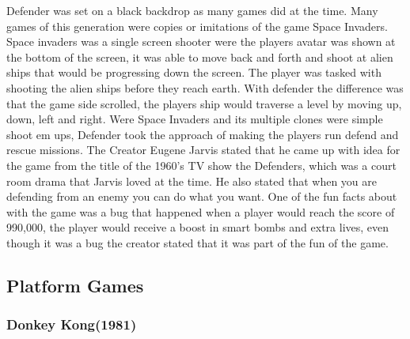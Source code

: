 \documentclass{article}
\begin{document}
Defender was set on a black backdrop as many games did at the time. Many games of this generation were copies or imitations of the game Space Invaders. Space invaders was a single screen shooter were the players avatar was shown at the bottom of the screen, it was able to move back and forth and shoot at alien ships that would be progressing down the screen. The player was tasked with shooting the alien ships before they reach earth. With defender the difference was that the game side scrolled, the players ship would traverse a level by moving up, down, left and right. Were Space Invaders and its multiple clones were simple shoot em ups, Defender took the approach of making the players run defend and rescue missions. The Creator Eugene Jarvis stated that he came up with idea for the game from the title of the 1960's TV show the Defenders, which was a court room drama that Jarvis loved at the time. He also stated that when you are defending from an enemy you can do what you want. One of the fun facts about with the game was a bug that happened when a player would reach the score of 990,000, the player would receive a boost in smart bombs and extra lives, even though it was a bug the creator stated that it was part of the fun of the game.
\clearpage	
		
\subsection{Platform Games}

\subsubsection{Donkey Kong(1981)}
\end{document}
